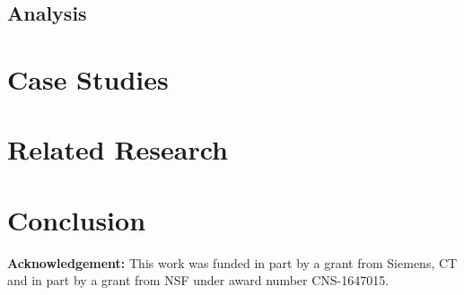 \documentclass[conference, compsoc]{IEEEtran}
\theoremstyle{definition}
\begin{document}
\subsection{Analysis}
\label{sec:analysis}

\section{Case Studies}
\label{sec:results}

\section{Related Research}
\label{sec:related}

\section{Conclusion}
\label{sec:conclusion}


\vspace{0.5em}
\noindent\textbf{Acknowledgement:}
This work was funded in part by a grant from Siemens, CT and in part by a grant from NSF under award number CNS-1647015.


\let\oldbibliography\thebibliography
\renewcommand{\thebibliography}[1]{\oldbibliography{#1}
\setlength{\itemsep}{0pt}} %



\small{
 
}

\end{document}
